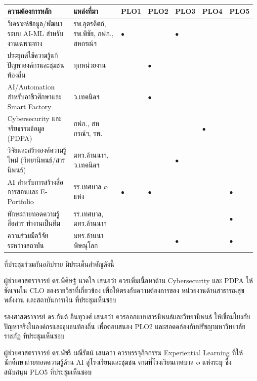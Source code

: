 \documentclass{meetingminutes}
\begin{document}
\vspace{6pt}
\noindent\small
\begin{tabular}{|p{5.0cm}|p{2.8cm}|>{\centering\arraybackslash}p{1.0cm}|>{\centering\arraybackslash}p{1.0cm}|>{\centering\arraybackslash}p{1.0cm}|>{\centering\arraybackslash}p{1.0cm}|>{\centering\arraybackslash}p{1.0cm}|}
\hline
\bfseries ความต้องการหลัก & \bfseries แหล่งที่มา & \bfseries PLO1 & \bfseries PLO2 & \bfseries PLO3 & \bfseries PLO4 & \bfseries PLO5 \\
\hline
วิเคราะห์ข้อมูล/พัฒนาระบบ AI-ML สำหรับงานเฉพาะทาง
  & รพ.อุตรดิตถ์, รพ.พิชัย, กฟภ., สหกรณ์ฯ & $\bullet$ & & $\bullet$ & & \\
\hline
ประยุกต์ใช้ความรู้แก้ปัญหาองค์กรและชุมชนท้องถิ่น
  & ทุกหน่วยงาน & & $\bullet$ & & & \\
\hline
AI/Automation สำหรับอาชีวศึกษาและ Smart Factory
  & ว.เทคนิคฯ & & $\bullet$ & & & \\
\hline
Cybersecurity และจริยธรรมข้อมูล (PDPA)
  & กฟภ., สหกรณ์ฯ, รพ. & & & & $\bullet$ & \\
\hline
วิจัยและสร้างองค์ความรู้ใหม่ (วิทยานิพนธ์/สารนิพนธ์)
  & มทร.ล้านนาฯ, ว.เทคนิคฯ & & & $\bullet$ & & \\
\hline
AI สำหรับการสร้างสื่อการสอนและ E-Portfolio
  & รร.เทศบาล ๓ แห่ง & $\bullet$ & $\bullet$ & & & $\bullet$ \\
\hline
ทักษะถ่ายทอดความรู้ สื่อสาร ทำงานเป็นทีม
  & รร.เทศบาล, มทร.ล้านนาฯ & & & & & $\bullet$ \\
\hline
ความร่วมมือวิจัยระหว่างสถาบัน
  & มทร.ล้านนา พิษณุโลก & & & $\bullet$ & & $\bullet$ \\
\hline
\end{tabular}
\normalsize

\vspace{8pt}
\noindent ที่ประชุมร่วมกันอภิปราย มีประเด็นสำคัญดังนี้

\begin{thailist}
  \item ผู้ช่วยศาสตราจารย์ ดร.พิศิษฐ์ นาคใจ เสนอว่า ควรเพิ่มเนื้อหาด้าน Cybersecurity
        และ PDPA ให้ชัดเจนใน CLO ของรายวิชาที่เกี่ยวข้อง เพื่อให้ตรงกับความต้องการของ
        หน่วยงานด้านสาธารณสุข พลังงาน และสถาบันการเงิน ที่ประชุมเห็นชอบ
  \item รองศาสตราจารย์ ดร.กันต์ อินทุวงศ์ เสนอว่า ควรออกแบบสารนิพนธ์และวิทยานิพนธ์
        ให้เชื่อมโยงกับปัญหาจริงในองค์กรและชุมชนท้องถิ่น เพื่อตอบสนอง PLO2
        และสอดคล้องกับปรัชญามหาวิทยาลัยราชภัฏ ที่ประชุมเห็นชอบ
  \item ผู้ช่วยศาสตราจารย์ ดร.พัชรี มณีรัตน์ เสนอว่า ควรบรรจุกิจกรรม Experiential Learning
        ที่ให้นักศึกษาถ่ายทอดความรู้ด้าน AI สู่โรงเรียนและชุมชน
        ตามที่โรงเรียนเทศบาล ๓ แห่งระบุ ซึ่งสนับสนุน PLO5 ที่ประชุมเห็นชอบ
\end{thailist}
\end{document}
